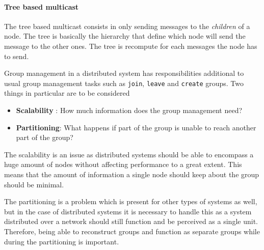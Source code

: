 \paragraph{Tree based multicast}{
    The tree based multicast consists in only sending
 messages to the \textit{children} of a node. The
 tree is basically the hierarchy that define which node
 will send the message to the other ones. The tree is
 recompute for each messages the node has to send.
}

	Group management in a distributed system has responsibilities additional to usual group management tasks such as \texttt{join}, \texttt{leave} and \texttt{create} groups.
	Two things in particular are to be considered
	\begin{itemize}
		\item \textbf{Scalability} : How much information does the group management need?
		\item \textbf{Partitioning}: What happens if part of the group is unable to reach another part of the group?
	\end{itemize}

	The scalability is an issue as distributed systems should be able to encompass a huge amount of nodes without affecting performance to a great extent.
	This means that the amount of information a single node should keep about the group should be minimal.

	The partitioning is a problem which is present for other types of systems as well, but in the case of distributed systems it is necessary to handle this as a system distributed over a network should still function and be perceived as a single unit.
	Therefore, being able to reconstruct groups and function as separate groups while during the partitioning is important.
